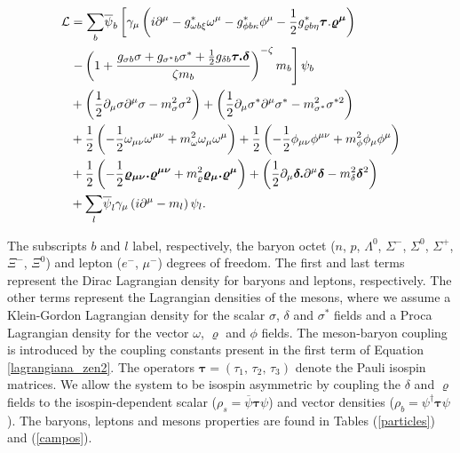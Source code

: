 \documentclass[twocolumn,showpacs,aps]{revtex4}
\begin{document}
\small
\begin{equation}\begin{split}\label{lagrangiana_zen2}
\mathcal{L}&= \underset{b}{\sum}\overline{\psi}_{b}\left[\gamma_{\mu}\left(i\partial^{\mu}-g_{\omega b \xi}^{*}\omega^{\mu} -g_{\phi b \kappa}^{*}\phi^{\mu}
-\frac{1}{2}g_{\varrho b \eta}^{*}\mathbf{\boldsymbol{\textrm{\ensuremath{\tau}.\ensuremath{\varrho^{\mu}}}}}\right) \right.
\\& \left. - \left(1+\frac{g_{\sigma b}\sigma+g_{\sigma^* b}\sigma^*
+\frac{1}{2}g_{\delta b}\boldsymbol{\tau.\delta}}{\zeta m_{b}}\right)^{-\zeta} m_b\right]\psi_{b}
\\& +\left(\frac{1}{2}\partial_{\mu}\sigma\partial^{\mu}\sigma-m_{\sigma}^{2}\sigma^{2}\right)
+\left(\frac{1}{2}\partial_{\mu}\sigma^*\partial^{\mu}\sigma^*-m_{\sigma^*}^{2}\sigma^{* 2}\right)
\\&+\frac{1}{2}\left(-\frac{1}{2}\omega_{\mu\nu}\omega^{\mu\nu}+m_{\omega}^{2}\omega_{\mu}\omega^{\mu}\right)
+\frac{1}{2}\left(-\frac{1}{2}\phi_{\mu\nu}\phi^{\mu\nu}+m_{\phi}^{2}\phi_{\mu}\phi^{\mu}\right)
\\&+\frac{1}{2}\left(-\frac{1}{2}\boldsymbol{\varrho_{\mu\nu}.\varrho^{\mu\nu}}+m_{\varrho}^{2}\boldsymbol{\varrho_{\mu}.\varrho^{\mu}}\right)
+\left(\frac{1}{2}\partial_{\mu}\boldsymbol{\delta.}\partial^{\mu}\boldsymbol{\delta}-m_{\delta}^{2}\boldsymbol{\delta}^{2}\right)
\\& +\underset{l}{\sum}\overline{\psi}_{l}\gamma_{\mu}\left(i\partial^{\mu}-m_{l}\right)\psi_{l}.
\end{split}\end{equation}
\normalsize

The subscripts $b$ and $l$ label, respectively, the baryon octet ($n$, $p$, $\Lambda^0$, $\Sigma^-$, $\Sigma^0$, $\Sigma^+$, $\Xi^-$, $\Xi^0$)  
and lepton ($e^-$, $\mu^-$) degrees of freedom. 
The first and last terms represent the Dirac Lagrangian density for baryons and leptons, respectively. 
The other terms represent the Lagrangian densities of the mesons, where we assume a
Klein-Gordon Lagrangian density for the scalar $\sigma$, $\delta$ and $\sigma^*$ fields and a Proca Lagrangian density for the
vector $\omega$, $\varrho$ and $\phi$ fields. The meson-baryon coupling is introduced by the coupling constants present in the first term
of Equation \ref{lagrangiana_zen2}. 
The operators $\boldsymbol{\tau}=(\tau_1,\,\tau_2,\,\tau_3)$ denote the 
Pauli isospin matrices. 
We allow the system to be isospin asymmetric by coupling the $\delta$ and $\varrho$ 
fields to the isospin-dependent scalar ($\rho_s=\overline{\psi}\boldsymbol{\tau}\psi$) and vector densities ($\rho_b=\psi^{\dagger}\boldsymbol{\tau}\psi$).
The baryons, leptons and mesons properties are found in Tables (\ref{particles}) and (\ref{campos}).
\end{document}
